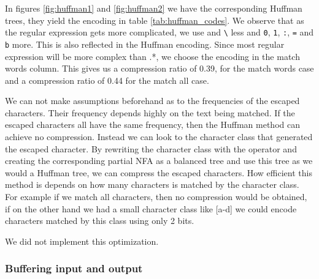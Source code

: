 In figures \vref{fig:huffman1} and \vref{fig:huffman2} we have the
corresponding Huffman trees, they yield the encoding in table
\vref{tab:huffman_codes}. We observe that as the regular expression
gets more complicated, we use \texttt{\textbar} and
\texttt{\textbackslash} less and \texttt{0}, \texttt{1}, \texttt{:},
\texttt{=} and \texttt{b} more. This is also reflected in the Huffman
encoding. Since most regular expression will be more complex than
\textsf{.*}, we choose the encoding in the match words column. This
gives us a compression ratio of 0.39, for the match words case
and a compression ratio of 0.44 for the match all case. 


We can not make assumptions beforehand as to the frequencies of the
escaped characters. Their frequency depends highly on the text being
matched. If the escaped characters all have the same frequency, then
the Huffman method can achieve no compression. Instead we can look to
the character class that generated the escaped character. By rewriting
the character class with the \textsf{\textbar} operator and creating
the corresponding partial NFA as a balanced tree and use this tree as
we would a Huffman tree, we can compress the escaped characters. How
efficient this method is depends on how many characters is matched by
the character class. For example if we match all characters, then no
compression would be obtained, if on the other hand we had a small
character class like \textsf{[a-d]} we could encode characters matched
by this class using only 2 bits. 

We did not implement this optimization.

\subsubsection{Buffering input and output}


